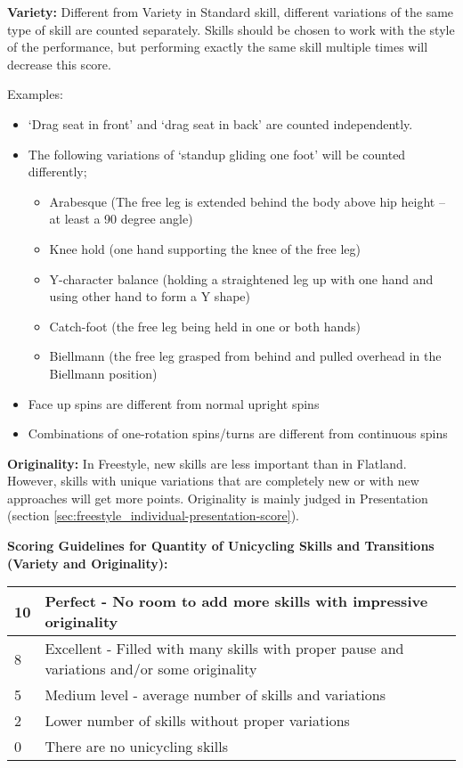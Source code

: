 \textbf{Variety:} Different from Variety in Standard skill, different variations of the same type of skill are counted separately.
Skills should be chosen to work with the style of the performance, but performing exactly the same skill multiple times will decrease this score.

Examples:
\begin{itemize}
\item `Drag seat in front' and `drag seat in back' are counted independently.
\item The following variations of `standup gliding one foot' will be counted differently;
	\begin{itemize}
 	\item Arabesque (The free leg is extended behind the body above hip height – at least a 90 degree angle)
	\item Knee hold (one hand supporting the knee of the free leg)
	\item Y-character balance (holding a straightened leg up with one hand and using other hand to form a Y shape)
	\item Catch-foot (the free leg being held in one or both hands)
	\item Biellmann (the free leg grasped from behind and pulled overhead in the Biellmann position) 
	\end{itemize}
\item Face up spins are different from normal upright spins 
\item Combinations of one-rotation spins/turns are different from continuous spins
\end{itemize}

\textbf{Originality:} In Freestyle, new skills are less important than in Flatland.
However, skills with unique variations that are completely new or with new approaches will get more points.
Originality is mainly judged in Presentation (section \ref{sec:freestyle_individual-presentation-score}).

\textbf{Scoring Guidelines for Quantity of Unicycling Skills and Transitions (Variety and Originality):}

\begin{tabular}{|l|p{12.5cm}|}
\hline
10 & Perfect - No room to add more skills with impressive originality \\
\hline
8 & Excellent - Filled with many skills with proper pause and variations and/or some originality \\
\hline
5 & Medium level - average number of skills and variations \\
\hline
2 & Lower number of skills without proper variations \\
\hline
0 & There are no unicycling skills \\
\hline
\end{tabular}

